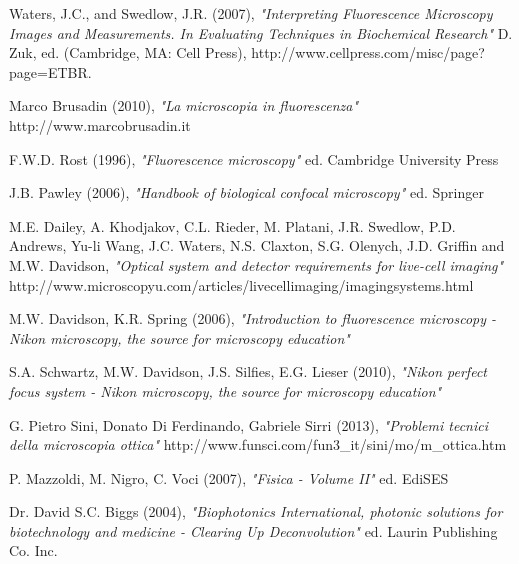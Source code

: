 \clearpage{\pagestyle{empty}\cleardoublepage}

\begin{thebibliography}{3}


 Waters, J.C., and Swedlow, J.R. (2007), \emph {"Interpreting Fluorescence Microscopy Images and Measurements. In Evaluating Techniques in Biochemical Research"} \newline D. Zuk, ed. (Cambridge, MA: Cell Press), \newline http://www.cellpress.com/misc/page?page=ETBR.

 Marco Brusadin (2010), \emph{"La microscopia in fluorescenza"} \newline  http://www.marcobrusadin.it

 F.W.D. Rost (1996), \emph{"Fluorescence microscopy"} \newline ed. Cambridge University Press

 J.B. Pawley (2006), \emph{"Handbook of biological confocal microscopy"} \newline ed. Springer

 M.E. Dailey, A. Khodjakov, C.L. Rieder, M. Platani, J.R. Swedlow, P.D. Andrews, Yu-li Wang, J.C. Waters, N.S. Claxton, S.G. Olenych, J.D. Griffin and M.W. Davidson, \emph{"Optical system and detector requirements for live-cell imaging"} \newline http://www.microscopyu.com/articles/livecellimaging/imagingsystems.html

 M.W. Davidson, K.R. Spring (2006), \emph{"Introduction to fluorescence microscopy - Nikon microscopy, the source for microscopy education"} 

 S.A. Schwartz, M.W. Davidson, J.S. Silfies, E.G. Lieser (2010), \emph{"Nikon perfect focus system - Nikon microscopy, the source for microscopy education"} 

 G. Pietro Sini, Donato Di Ferdinando, Gabriele Sirri (2013), \emph{"Problemi tecnici della microscopia ottica"} \newline http://www.funsci.com/fun3\_it/sini/mo/m\_ottica.htm

 P. Mazzoldi, M. Nigro, C. Voci (2007), \emph{"Fisica - Volume II"} \newline ed. EdiSES

 Dr. David S.C. Biggs (2004), \emph{"Biophotonics International, photonic solutions for biotechnology and medicine - Clearing Up Deconvolution"} \newline ed. Laurin Publishing Co. Inc.


\end{thebibliography} 
